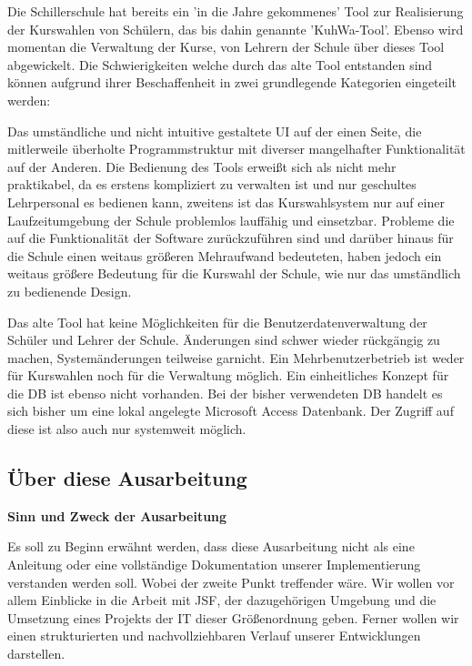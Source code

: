 Die Schillerschule hat bereits ein 'in die Jahre gekommenes' Tool zur Realisierung der Kurswahlen von Schülern, das bis dahin genannte 'KuhWa-Tool'. Ebenso wird momentan die Verwaltung der Kurse, von Lehrern der Schule über dieses Tool abgewickelt.
Die Schwierigkeiten welche durch das alte Tool entstanden sind können aufgrund ihrer Beschaffenheit in zwei grundlegende Kategorien eingeteilt werden:

Das umständliche und nicht intuitive gestaltete \ac{UI} auf der einen Seite, die mitlerweile überholte Programmstruktur mit diverser mangelhafter Funktionalität auf der Anderen.
Die Bedienung des Tools erweißt sich als nicht mehr praktikabel, da es erstens kompliziert zu verwalten ist und nur geschultes Lehrpersonal es bedienen kann, zweitens ist das Kurswahlsystem nur auf einer Laufzeitumgebung der Schule problemlos lauffähig und einsetzbar.
Probleme die auf die Funktionalität der Software zurückzuführen sind und darüber hinaus für die Schule einen weitaus größeren Mehraufwand bedeuteten, haben jedoch ein weitaus größere Bedeutung für die Kurswahl der Schule, wie nur das umständlich zu bedienende Design.

Das alte Tool hat keine Möglichkeiten für die Benutzerdatenverwaltung der Schüler und Lehrer der Schule. Änderungen sind schwer wieder rückgängig zu machen, Systemänderungen teilweise garnicht.
Ein Mehrbenutzerbetrieb ist weder für Kurswahlen noch für die Verwaltung möglich.
Ein einheitliches Konzept für die \ac{DB} ist ebenso nicht vorhanden.
Bei der bisher verwendeten \ac{DB} handelt es sich bisher um eine lokal angelegte \gls{Microsoft Access Datenbank}. Der Zugriff auf diese ist also auch nur systemweit möglich.

\subsection{Über diese Ausarbeitung}\label{subsec:Uber diese Ausarbeitung}

\textbf{Sinn und Zweck der Ausarbeitung}

Es soll zu Beginn erwähnt werden, dass diese Ausarbeitung nicht als eine Anleitung oder eine vollständige Dokumentation unserer Implementierung verstanden werden soll. Wobei der zweite Punkt treffender wäre. Wir wollen vor allem Einblicke in die Arbeit mit \ac{JSF}, der dazugehörigen Umgebung und die Umsetzung eines Projekts der \ac{IT} dieser Größenordnung geben. Ferner wollen wir einen strukturierten und nachvollziehbaren Verlauf unserer Entwicklungen darstellen.

